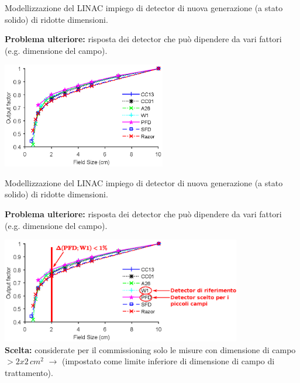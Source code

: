 \documentclass{beamer}
\begin{document}
\begin{frame}[t]{Modellizzazione del LINAC}
\footnotesize
{} impiego di detector di nuova generazione (a stato solido) di ridotte dimensioni.\\ \vspace{.5cm}

\alert{\bf Problema ulteriore:} risposta dei detector che può dipendere da vari fattori (e.g. dimensione del campo).\\ \vspace{.3cm}

\includegraphics[height=4.6cm]{./img/OF_Empty.eps}

\end{frame}


\begin{frame}[t]{Modellizzazione del LINAC}
\footnotesize
{} impiego di detector di nuova generazione (a stato solido) di ridotte dimensioni.\\ \vspace{.5cm}

\alert{\bf Problema ulteriore:} risposta dei detector che può dipendere da vari fattori (e.g. dimensione del campo).\\ \vspace{.3cm}

\includegraphics[height=4.6cm]{./img/OF_MOD.eps}\\\vspace{.2cm}
{\scriptsize \color{Dgreen} \textbf{Scelta:} considerate per il commissioning solo le misure con dimensione di campo $> 2x2\,cm^2$ $\rightarrow$ (impostato come limite inferiore di dimensione di campo di trattamento).}

\end{frame}
\end{document}

